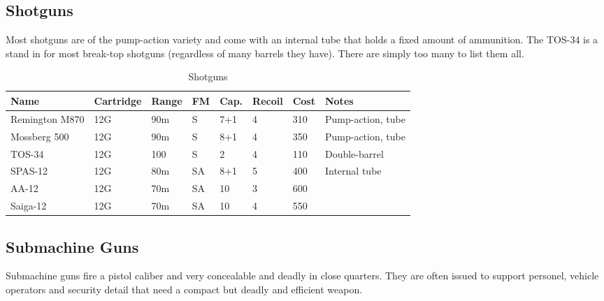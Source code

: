 \subsection{Shotguns}

Most shotguns are of the pump-action variety and come with an internal tube that
holds a fixed amount of ammunition. The TOS-34 is a stand in for most break-top
shotguns (regardless of many barrels they have). There are simply too many to
list them all.

\begin{table}
  \caption{Shotguns}
  \begin{center}
    \begin{tabular}{| l | l | l | l | l | l | l | l |}
      \hline
      \textbf{Name} & \textbf{Cartridge} & \textbf{Range} &
      \textbf{FM} & \textbf{Cap.} & \textbf{Recoil} &
      \textbf{Cost} & \textbf{Notes} \\ \hline

      Remington M870 & 12G & 90m & S  & 7+1 & 4 & 310 & Pump-action, tube \\ \hline
      Mossberg 500   & 12G & 90m & S  & 8+1 & 4 & 350 & Pump-action, tube \\ \hline
      TOS-34         & 12G & 100 & S  & 2   & 4 & 110 & Double-barrel \\ \hline
      SPAS-12        & 12G & 80m & SA & 8+1 & 5 & 400 & Internal tube \\ \hline
      AA-12          & 12G & 70m & SA & 10  & 3 & 600 & \\ \hline
      Saiga-12       & 12G & 70m & SA & 10  & 4 & 550 & \\ \hline

    \end{tabular}
  \end{center}
\end{table}

\subsection{Submachine Guns}

Submachine guns fire a pistol caliber and very concealable and deadly in close
quarters. They are often issued to support personel, vehicle operators and
security detail that need a compact but deadly and efficient weapon.

